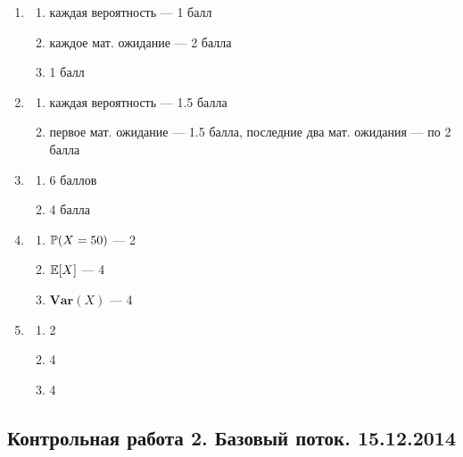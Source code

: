 \documentclass[12pt, a4paper]{article}\usepackage[]{graphicx}\usepackage[]{color}
\begin{document}
				\begin{enumerate}
					\item
					\begin{enumerate}
						\item каждая вероятность — 1 балл
						\item каждое мат. ожидание — 2 балла
						\item 1 балл
					\end{enumerate}

					\item
					\begin{enumerate}
						\item каждая вероятность — 1.5 балла
						\item первое мат. ожидание — 1.5 балла, последние два мат. ожидания — по 2 балла

					\end{enumerate}

					\item
					\begin{enumerate}
						\item 6 баллов
						\item 4 балла
					\end{enumerate}
					\item
					\begin{enumerate}
						\item $\P(X=50)$ — 2
						\item $\E[X]$ — 4
						\item $\mathbf{Var}(X)$ — 4
					\end{enumerate}

					\item
					\begin{enumerate}
						\item 2
						\item 4
						\item 4
					\end{enumerate}
				\end{enumerate}


				\subsection{Контрольная работа 2. Базовый поток. 15.12.2014}
\end{document}
